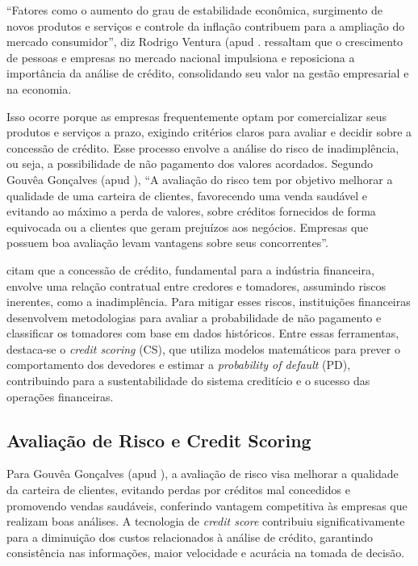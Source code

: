\documentclass[12pt,a4paper]{article}
\begin{document}
“Fatores como o aumento do grau de estabilidade econômica, surgimento de novos produtos e serviços e controle da inflação contribuem para a ampliação do mercado consumidor”, diz Rodrigo Ventura (apud \cite{fuhr2022}. \cite{fuhr2022} ressaltam que o crescimento de pessoas e empresas no mercado nacional impulsiona e reposiciona a importância da análise de crédito, consolidando seu valor na gestão empresarial e na economia. 

Isso ocorre porque as empresas frequentemente optam por comercializar seus produtos e serviços a prazo, exigindo critérios claros para avaliar e decidir sobre a concessão de crédito. Esse processo envolve a análise do risco de inadimplência, ou seja, a possibilidade de não pagamento dos valores acordados. Segundo Gouvêa Gonçalves (apud \cite{fuhr2022}), “A avaliação do risco tem por objetivo melhorar a qualidade de uma carteira de clientes, favorecendo uma venda saudável e evitando ao máximo a perda de valores, sobre créditos fornecidos de forma equivocada ou a clientes que geram prejuízos aos negócios. Empresas que possuem boa avaliação levam vantagens sobre seus concorrentes”. 

\cite{montevechi2022} citam que a concessão de crédito, fundamental para a indústria financeira, envolve uma relação contratual entre credores e tomadores, assumindo riscos inerentes, como a inadimplência. Para mitigar esses riscos, instituições financeiras desenvolvem metodologias para avaliar a probabilidade de não pagamento e classificar os tomadores com base em dados históricos. Entre essas ferramentas, destaca-se o \textit{credit scoring} (CS), que utiliza modelos matemáticos para prever o comportamento dos devedores e estimar a \textit{probability of default} (PD), contribuindo para a sustentabilidade do sistema creditício e o sucesso das operações financeiras.
\subsection{Avaliação de Risco e Credit Scoring}

Para Gouvêa Gonçalves (apud \cite{fuhr2022}), a avaliação de risco visa melhorar a qualidade da carteira de clientes, evitando perdas por créditos mal concedidos e promovendo vendas saudáveis, conferindo vantagem competitiva às empresas que realizam boas análises. A tecnologia de \textit{credit score} contribuiu significativamente para a diminuição dos custos relacionados à análise de crédito, garantindo consistência nas informações, maior velocidade e acurácia na tomada de decisão.
\end{document}
